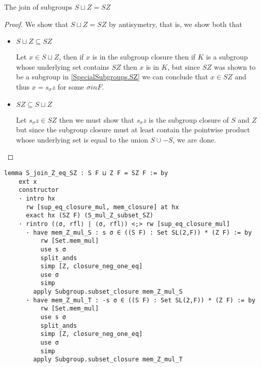 \begin{lemma}
    \label{SpecialSubgroups.S_join_Z_eq_SZ}
    \leanok
    The join of subgroups $S \sqcup Z = SZ$
\end{lemma}
\begin{proof}
\leanok
We show that $S \sqcup Z = SZ$ by antisymetry, that is, we show both that
\begin{itemize}
    
    \item $S \sqcup Z \subseteq SZ$
    
    Let $x \in S \sqcup Z$, then if $x$ is in the subgroup closure then if $K$ is a subgroup whose underlying set contains $SZ$ then $x$ is in $K$,
    but since $SZ$ was shown to be a subgroup in \ref{SpecialSubgroups.SZ} we can conclude that $x \in SZ$ and thus $x = s_\sigma z$ for some $\sigma in F$.
    
    \item $SZ \subseteq S \sqcup Z$
    
    Let $s_\sigma z \in SZ$ then we must show that $s_\sigma z$ is the subgroup closure of $S$ and $Z$ but since the subgroup closure 
    must at least contain the pointwise product whose underlying set is equal to the union $S \cup -S$, we are done.
\end{itemize}
\end{proof}
\begin{footnotesize}
\begin{verbatim}
lemma S_join_Z_eq_SZ : S F ⊔ Z F = SZ F := by
    ext x
    constructor
    · intro hx
      rw [sup_eq_closure_mul, mem_closure] at hx
      exact hx (SZ F) (S_mul_Z_subset_SZ)
    · rintro (⟨σ, rfl⟩ | ⟨σ, rfl⟩) <;> rw [sup_eq_closure_mul]
      · have mem_Z_mul_S : s σ ∈ ((S F) : Set SL(2,F)) * (Z F) := by
          rw [Set.mem_mul]
          use s σ
          split_ands
          simp [Z, closure_neg_one_eq]
          use σ
          simp
        apply Subgroup.subset_closure mem_Z_mul_S
      · have mem_Z_mul_T : -s σ ∈ ((S F) : Set SL(2,F)) * (Z F) := by
          rw [Set.mem_mul]
          use s σ
          split_ands
          simp [Z, closure_neg_one_eq]
          use σ
          simp
        apply Subgroup.subset_closure mem_Z_mul_T
\end{verbatim}
\end{footnotesize}

